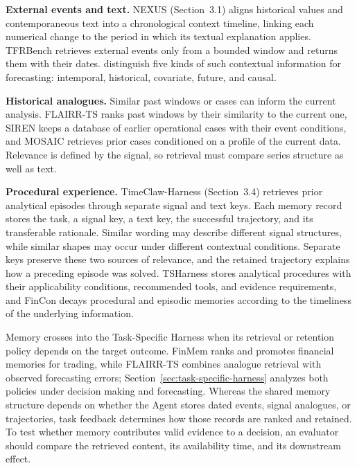 \documentclass[preprints,article,submit,moreauthors]{Definitions/mdpi}
\begin{document}
\noindent\textbf{External events and text.} NEXUS \citep{nexus2026} (Section~3.1) aligns historical values and contemporaneous text into a chronological context timeline, linking each numerical change to the period in which its textual explanation applies. TFRBench \citep{tfrbench2026} retrieves external events only from a bounded window and returns them with their dates. \citet{williams2025cik} distinguish five kinds of such contextual information for forecasting: intemporal, historical, covariate, future, and causal.

\noindent\textbf{Historical analogues.} Similar past windows or cases can inform the current analysis. FLAIRR-TS \citep{flairr2025} ranks past windows by their similarity to the current one, SIREN \citep{siren2026} keeps a database of earlier operational cases with their event conditions, and MOSAIC \citep{mosaic2026} retrieves prior cases conditioned on a profile of the current data. Relevance is defined by the signal, so retrieval must compare series structure as well as text.

\noindent\textbf{Procedural experience.} TimeClaw-Harness \citep{timeclaw2026harness} (Section~3.4) retrieves prior analytical episodes through separate signal and text keys. Each memory record stores the task, a signal key, a text key, the successful trajectory, and its transferable rationale. Similar wording may describe different signal structures, while similar shapes may occur under different contextual conditions. Separate keys preserve these two sources of relevance, and the retained trajectory explains how a preceding episode was solved. TSHarness \citep{tsharness2026} stores analytical procedures with their applicability conditions, recommended tools, and evidence requirements, and FinCon \citep{fincon2024} decays procedural and episodic memories according to the timeliness of the underlying information.

Memory crosses into the Task-Specific Harness when its retrieval or retention policy depends on the target outcome. FinMem \citep{finmem2023} ranks and promotes financial memories for trading, while FLAIRR-TS \citep{flairr2025} combines analogue retrieval with observed forecasting errors; Section~\ref{sec:task-specific-harness} analyzes both policies under decision making and forecasting. Whereas the shared memory structure depends on whether the Agent stores dated events, signal analogues, or trajectories, task feedback determines how those records are ranked and retained. To test whether memory contributes valid evidence to a decision, an evaluator should compare the retrieved content, its availability time, and its downstream effect.
\end{document}
